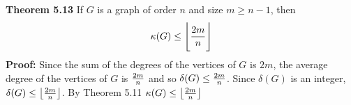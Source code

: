 \nopagenumbers
{\bf Theorem 5.13}
\vskip 6pt
If $G$ is a graph of order $n$ and size $m \geq n-1$, then $$ \kappa (G) \leq \Biggl\lfloor {2m \over n} \Biggr\rfloor$$
\vskip 10pt
{\bf Proof:}
\vskip 6pt
Since the sum of the degrees of the vertices of $G$ is $2m$, the average degree of the vertices of $G$ is ${2m \over n}$ and so $\delta (G) \leq {2m \over n}$. Since $\delta (G)$ is an integer, $\delta (G) \leq \bigl\lfloor {2m \over n} \bigr\rfloor$. By Theorem 5.11 $\kappa (G) \leq \bigl\lfloor {2m \over n} \bigr\rfloor$

\vfill\eject
